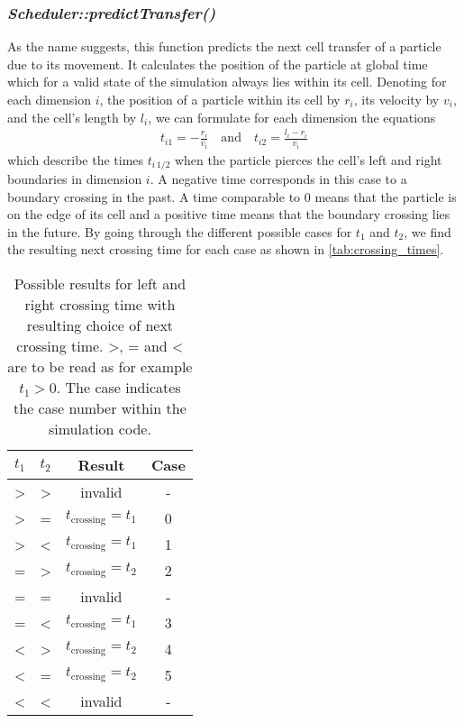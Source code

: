 \subsubsection{\quad \textit{Scheduler::predictTransfer()}}
As the name suggests, this function predicts the next cell transfer of a particle due to its movement. It calculates the position of the particle at global time which for a valid state of the simulation always lies within its cell. Denoting for each dimension $i$, the position of a particle within its cell by $r_i$, its velocity by $v_i$, and the cell's length by $l_i$, we can formulate for each dimension the equations
\begin{align}
t_{i1}=-\frac{r_i}{v_i} \quad \text{and} \quad t_{i2}=\frac{l_i-r_i}{v_i} 
\end{align}
which describe the times $t_{i \, 1/2}$ when the particle pierces the cell's left and right boundaries in dimension $i$. A negative time corresponds in this case to a boundary crossing in the past. A time comparable to 0 means that the particle is on the edge of its cell and a positive time means that the boundary crossing lies in the future. By going through the different possible cases for $t_1$ and $t_2$, we find the resulting next crossing time for each case as shown in \autoref{tab:crossing_times}.
\begin{table}[h]
\centering
\begin{tabular}{c|c||c|c}
$t_1$ & $t_2$ & Result & Case \\ \hline
> & > & invalid & - \\ \hline
> & = & $t_{\text{crossing}} = t_1$ & 0 \\ \hline
> & < & $t_{\text{crossing}} = t_1$ & 1 \\ \hline
= & > & $t_{\text{crossing}} = t_2$ & 2\\ \hline
= & = & invalid & - \\ \hline
= & < & $t_{\text{crossing}} = t_1$ & 3 \\ \hline
< & > & $t_{\text{crossing}} = t_2$ & 4 \\ \hline
< & = & $t_{\text{crossing}} = t_2$ & 5\\ \hline
< & < & invalid & - \\ \hline
\end{tabular}
\caption[Cell boundary crossing conditions]{Possible results for left and right crossing time with resulting choice of next crossing time. >, = and < are to be read as for example $t_1 > 0$. The case indicates the case number within the simulation code.}
\label{tab:crossing_times}
\end{table}

